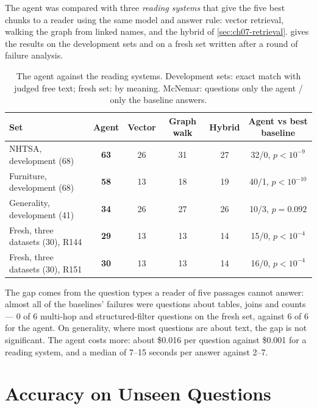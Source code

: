 The agent was compared with three \emph{reading systems} that give the five best chunks to a reader using the same
model and answer rule: vector retrieval, walking the graph from linked names, and the hybrid of
\cref{sec:ch07-retrieval}.  gives the results on the development sets and on a fresh set
written after a round of failure analysis.

\begin{table}[htbp]
\centering
\caption{The agent against the reading systems. Development sets: exact match with judged free text; fresh set: by
meaning. McNemar: questions only the agent / only the baseline answers.}
\label{tab:agent-baselines}
\small
\begin{tabularx}{\linewidth}{@{}Xccccc@{}}
\toprule
Set & Agent & Vector & Graph walk & Hybrid & Agent vs best baseline \\
\midrule
NHTSA, development (68) & \textbf{63} & 26 & 31 & 27 & 32/0, $p < 10^{-9}$ \\
Furniture, development (68) & \textbf{58} & 13 & 18 & 19 & 40/1, $p < 10^{-10}$ \\
Generality, development (41) & \textbf{34} & 26 & 27 & 26 & 10/3, $p = 0.092$ \\
Fresh, three datasets (30), R144 & \textbf{29} & 13 & 13 & 14 & 15/0, $p < 10^{-4}$ \\
Fresh, three datasets (30), R151 & \textbf{30} & 13 & 13 & 14 & 16/0, $p < 10^{-4}$ \\
\bottomrule
\end{tabularx}
\end{table}

The gap comes from the question types a reader of five passages cannot answer: almost all of the baselines' failures
were questions about tables, joins and counts --- 0 of 6 multi-hop and structured-filter questions on the fresh set,
against 6 of 6 for the agent. On generality, where most questions are about text, the gap is not significant. The
agent costs more: about \$0.016 per question against \$0.001 for a reading system, and a median of 7--15 seconds per
answer against 2--7.

\section{Accuracy on Unseen Questions}\label{sec:ch07-unseen}

